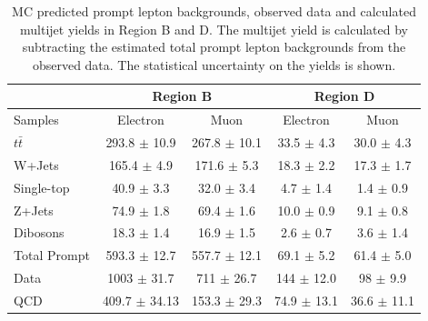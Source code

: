 \begin{table}
\begin{center}
\begin{tabular}{l|c|c||c|c}
              &\multicolumn{2}{c||}{Region B}                &\multicolumn{2}{c}{Region D} \\
\hline
Samples       & Electron               & Muon                & Electron          & Muon \\      
\hline
$t\bar{t}$    &  293.8 $\pm$ 10.9    & 267.8 $\pm$ 10.1    & 33.5 $\pm$ 4.3   & 30.0 $\pm$ 4.3  \\
W+Jets        &  165.4 $\pm$ 4.9     & 171.6 $\pm$ 5.3     & 18.3 $\pm$ 2.2   & 17.3 $\pm$ 1.7  \\         
Single-top    &   40.9 $\pm$ 3.3     &  32.0 $\pm$ 3.4     &  4.7 $\pm$ 1.4   & 1.4 $\pm$ 0.9   \\ 
Z+Jets        &   74.9 $\pm$ 1.8     &  69.4 $\pm$ 1.6     & 10.0 $\pm$ 0.9   & 9.1 $\pm$ 0.8   \\ 
Dibosons      &   18.3 $\pm$ 1.4     &  16.9 $\pm$ 1.5     &  2.6 $\pm$ 0.7   & 3.6 $\pm$ 1.4   \\ 
\hline
Total Prompt  &  593.3 $\pm$ 12.7    & 557.7 $\pm$ 12.1    & 69.1 $\pm$ 5.2   & 61.4 $\pm$ 5.0  \\ 
\hline
Data          &  1003  $\pm$ 31.7    & 711   $\pm$ 26.7    & 144  $\pm$ 12.0  & 98   $\pm$ 9.9  \\
\hline
QCD           & 409.7 $\pm$ 34.13    & 153.3 $\pm$ 29.3    & 74.9 $\pm$ 13.1  & 36.6 $\pm$ 11.1 \\
\end{tabular}
\end{center}
\caption{MC predicted prompt lepton backgrounds, observed data and calculated multijet yields 
in Region B and D. The multijet yield is calculated by 
subtracting the estimated total prompt lepton backgrounds from the observed data. 
The statistical uncertainty on the yields is shown.} 
\label{tab:boosted_region_bd_promptbkgdscaled_data}
\end{table}

